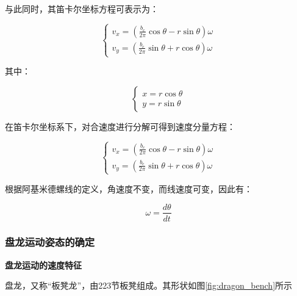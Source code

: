 \documentclass[withoutpreface, bwprint]{cumcmthesis} %
\begin{document}
与此同时，其笛卡尔坐标方程可表示为：

\begin{equation}
    \begin{cases}
        v_{x} = \left(\frac{b_{c}}{2\pi}\cos\theta - r\sin\theta \right)\omega \\
        v_{y} = \left(\frac{b_{c}}{2\pi}\sin\theta + r\cos\theta \right)\omega
    \end{cases}
\end{equation}

其中：

\begin{equation}
    \begin{cases}
        x = r\cos\theta \\
        y = r\sin\theta
    \end{cases}
\end{equation}

在笛卡尔坐标系下，对合速度进行分解可得到速度分量方程：

\begin{equation}
    \begin{cases}
        v_{x} = \left(\frac{b_{c}}{2\pi}\cos\theta - r\sin\theta \right)\omega \\
        v_{y} = \left(\frac{b_{c}}{2\pi}\sin\theta + r\cos\theta \right)\omega
    \end{cases}
\end{equation}

根据阿基米德螺线的定义，角速度不变，而线速度可变，因此有：

\begin{equation}
    \omega = \frac{d\theta}{dt}
\end{equation}

\subsubsection{盘龙运动姿态的确定}

\textbf{盘龙运动的速度特征}

盘龙，又称“板凳龙”，由223节板凳组成。其形状如图\ref{fig:dragon_bench}所示
\end{document}

